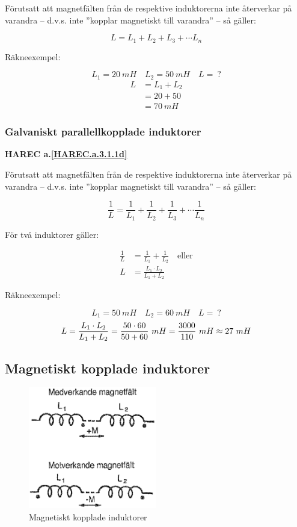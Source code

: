 Förutsatt att magnetfälten från de respektive induktorerna inte återverkar på
varandra -- d.v.s. inte ''kopplar magnetiskt till varandra'' -- så gäller:

\[L = L_1 + L_2 + L_3 + \cdots L_n\]

Räkneexempel:

\[L_1 = 20\ mH \quad L_2 = 50\ mH \quad L =\ ?\]
\begin{align*}
  L &= L_1 + L_2 \\
  & = 20 + 50 \\
  &= 70\ mH
\end{align*}

\subsubsection{Galvaniskt parallellkopplade induktorer}
\textbf{HAREC a.\ref{HAREC.a.3.1.1d}\label{myHAREC.a.3.1.1d}}

Förutsatt att magnetfälten från de respektive induktorerna inte återverkar på
varandra -- d.v.s. inte ''kopplar magnetiskt till varandra'' -- så gäller:

\[
\frac{1}{L} = \frac{1}{L_1} + \frac{1}{L_2} + \frac{1}{L_3} +
\cdots \frac{1}{L_n}
\]

För två induktorer gäller:

\begin{align*}
  \frac{1}{L} &= \frac{1}{L_1} + \frac{1}{L_2} \quad \text{eller} \\
  L &= \frac{L_1 \cdot L_2}{L_1 + L_2}
\end{align*}

Räkneexempel:

\[L_1 = 50\ mH \quad L_2 = 60\ mH \quad L =\ ?\]
\[
  L = \frac{L_1 \cdot L_2}{L_1 + L_2} \\
  = \frac{50 \cdot 60}{50 + 60}\ mH \\
  = \frac{3000}{110}\ mH \\
  \approx 27\ mH
\]

\subsection{Magnetiskt kopplade induktorer}

\begin{figure}
\includegraphics[width=0.5\textwidth]{images/cropped_pdfs/bild_2_3-07.pdf}
\caption{Magnetiskt kopplade induktorer}
\label{fig:BildII3-07}
\end{figure}

